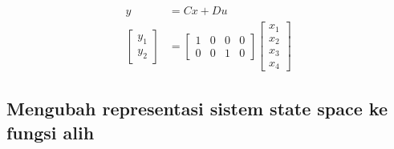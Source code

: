 \documentclass[../main.tex]{subfiles}
\begin{document}
            \begin{equation}
                \begin{split}
                    y &= Cx + Du \\[5pt]
                    \begin{bmatrix} y_1 \\ y_2 \end{bmatrix} &= \begin{bmatrix} 1 & 0 & 0 & 0 \\ 0 & 0 & 1& 0 \end{bmatrix} \begin{bmatrix} x_1 \\ x_2 \\ x_3 \\ x_4 \end{bmatrix}
                \end{split}
            \end{equation}
        \subsection{Mengubah representasi sistem state space ke fungsi alih}
\end{document}
